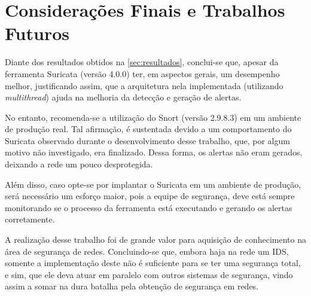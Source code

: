 \chapter{Considerações Finais e Trabalhos Futuros} \label{ch:considerações}

Diante dos resultados obtidos na \autoref{sec:resultados}, conclui-se que, apesar da ferramenta Suricata (versão 4.0.0) ter, em aspectos gerais, um desempenho melhor, justificando assim, que a arquitetura nela implementada (utilizando \textit{multithread}) ajuda na melhoria da detecção e geração de alertas. 

No entanto, recomenda-se a utilização do Snort (versão 2.9.8.3) em um ambiente de produção real. Tal afirmação, é sustentada devido a um comportamento do Suricata observado durante o desenvolvimento desse trabalho, que, por algum motivo não investigado, era finalizado. Dessa forma, os alertas não eram gerados, deixando a rede um pouco desprotegida.

Além disso, caso opte-se por implantar o Suricata em um ambiente de produção, será necessário um esforço maior, pois a equipe de segurança, deve está sempre monitorando se o processo da ferramenta está executando e gerando os alertas corretamente.

A realização desse trabalho foi de grande valor para aquisição de conhecimento na área de segurança de redes. Concluindo-se que, embora haja na rede um IDS, somente a implementação deste não é suficiente para se ter uma segurança total, e sim, que ele deva atuar em paralelo com outros sistemas de segurança, vindo assim a somar na dura batalha pela obtenção de segurança em redes. 


